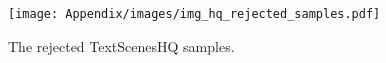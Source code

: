 \begin{figure}
    \centering
    \texttt{[image: Appendix/images/img\_hq\_rejected\_samples.pdf]}
    \caption{The rejected TextScenesHQ samples.}
    \label{fig:hq_reject_sample}
\end{figure}